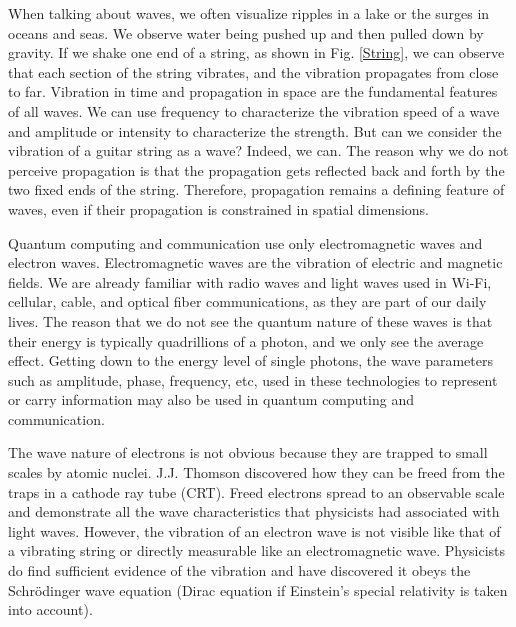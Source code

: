 \documentclass[oneside, letter, 12pt]{book}
\begin{document}
When talking about waves, we often visualize ripples in a lake or the surges in oceans and seas. We observe water being pushed up and then pulled down by gravity. If we shake one end of a string, as shown in Fig. \ref{String}, we can observe that each section of the string vibrates, and the vibration propagates from close to far. Vibration in time and propagation in space are the fundamental features of all waves. We can use frequency to characterize the vibration speed of a wave and amplitude or intensity to characterize the strength. But can we consider the vibration of a guitar string as a wave? Indeed, we can. The reason why we do not perceive propagation is that the propagation gets reflected back and forth by the two fixed ends of the string. Therefore, propagation remains a defining feature of waves, even if their propagation is constrained in spatial dimensions.

Quantum computing and communication use only electromagnetic waves and electron waves. Electromagnetic waves are the vibration of electric and magnetic fields. We are already familiar with radio waves and light waves used in Wi-Fi, cellular, cable, and optical fiber communications, as they are part of our daily lives. The reason that we do not see the quantum nature of these waves is that their energy is typically quadrillions of a photon, and we only see the average effect. Getting down to the energy level of single photons, the wave parameters such as amplitude, phase, frequency, etc, used in these technologies to represent or carry information may also be used in quantum computing and communication.

The wave nature of electrons is not obvious because they are trapped to small scales by atomic nuclei. J.J. Thomson discovered how they can be freed from the traps\cite{THOMSON} in a cathode ray tube (CRT). Freed electrons spread to an observable scale and demonstrate all the wave characteristics that physicists had associated with light waves. However, the vibration of an electron wave is not visible like that of a vibrating string or directly measurable like an electromagnetic wave. Physicists do find sufficient evidence of the vibration and have discovered it obeys the Schrödinger wave equation (Dirac equation if Einstein's special relativity is taken into account).
\end{document}
